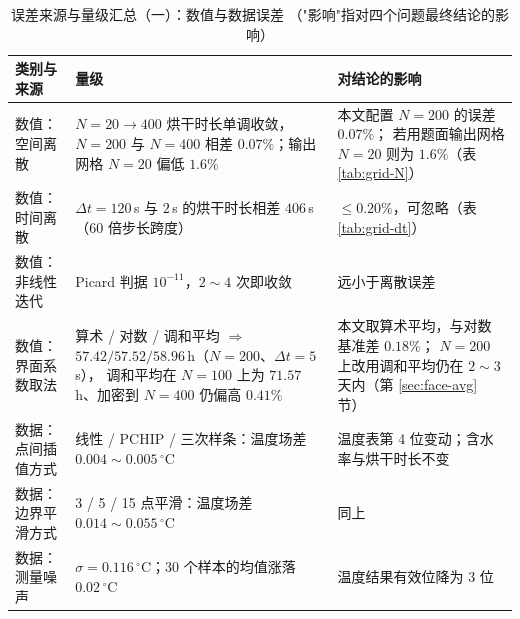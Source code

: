 \documentclass[12pt,a4paper,fontset=none]{ctexart}
\begin{document}
\begin{table}[htbp]
  \centering
  \caption{误差来源与量级汇总（一）：数值与数据误差
    （"影响"指对四个问题最终结论的影响）}
  \label{tab:err}
  \small
  \begin{tabular}{p{2.6cm}p{5.2cm}p{6.2cm}}
    \toprule
    类别与来源 & 量级 & 对结论的影响 \\
    \midrule
    数值：空间离散 & $N=20\to400$ 烘干时长单调收敛，
      $N=200$ 与 $N=400$ 相差 $0.07\%$；输出网格 $N=20$ 偏低 $1.6\%$
      & 本文配置 $N=200$ 的误差 $0.07\%$；
        若用题面输出网格 $N=20$ 则为 $1.6\%$（表 \ref{tab:grid-N}） \\
    数值：时间离散 & $\Delta t=120$\,s 与 $2$\,s 的烘干时长相差
      $406$\,s（$60$ 倍步长跨度）
      & $\le0.20\%$，可忽略（表 \ref{tab:grid-dt}） \\
    数值：非线性迭代 & Picard 判据 $10^{-11}$，$2\sim4$ 次即收敛
      & 远小于离散误差 \\
    数值：界面系数取法 & 算术 / 对数 / 调和平均 $\Rightarrow$
      $57.42/57.52/58.96$\,h（$N=200$、$\Delta t=5$\,s），
      调和平均在 $N=100$ 上为 $71.57$\,h、加密到 $N=400$ 仍偏高 $0.41\%$
      & 本文取算术平均，与对数基准差 $0.18\%$；
        $N=200$ 上改用调和平均仍在 $2\sim3$ 天内（第 \ref{sec:face-avg} 节） \\
    \midrule
    数据：点间插值方式 & 线性 / PCHIP / 三次样条：温度场差
      $0.004\sim0.005\,^\circ$C
      & 温度表第 4 位变动；含水率与烘干时长不变 \\
    数据：边界平滑方式 & 3 / 5 / 15 点平滑：温度场差
      $0.014\sim0.055\,^\circ$C & 同上 \\
    数据：测量噪声 & $\sigma=0.116\,^\circ$C；30 个样本的均值涨落
      $0.02\,^\circ$C & 温度结果有效位降为 3 位 \\
    \bottomrule
  \end{tabular}
\end{table}
\end{document}
